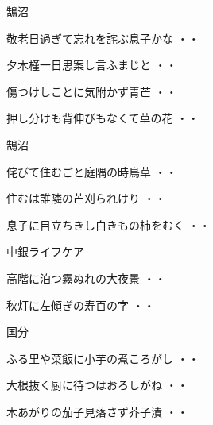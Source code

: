 \vspace{0.6cm}
鵠沼
\begin{shiika}敬老日過ぎて忘れを詫ぶ息子かな
\hfill{・・}\end{shiika}
\vspace{0.6cm}
\begin{shiika}夕木槿一日思案し言ふまじと
\hfill{・・}\end{shiika}
\vspace{0.6cm}
\begin{shiika}傷つけしことに気附かず青芒
\hfill{・・}\end{shiika}
\vspace{0.6cm}
\begin{shiika}押し分けも背伸びもなくて草の花
\hfill{・・}\end{shiika}
\vspace{0.6cm}
鵠沼
\begin{shiika}侘びて住むごと庭隅の時鳥草
\hfill{・・}\end{shiika}
\vspace{0.6cm}
\begin{shiika}住むは誰隣の芒刈られけり
\hfill{・・}\end{shiika}
\vspace{0.6cm}
\begin{shiika}息子に目立ちきし白きもの柿をむく
\hfill{・・}\end{shiika}
\vspace{0.6cm}
中銀ライフケア
\begin{shiika}高階に泊つ霧ぬれの大夜景
\hfill{・・}\end{shiika}
\vspace{0.6cm}
\begin{shiika}秋灯に左傾ぎの寿百の字
\hfill{・・}\end{shiika}
\vspace{0.6cm}
国分
\begin{shiika}ふる里や菜飯に小芋の煮ころがし
\hfill{・・}\end{shiika}
\begin{shiika}大根抜く厨に待つはおろしがね
\hfill{・・}\end{shiika}
\begin{shiika}木あがりの茄子見落さず芥子漬
\hfill{・・}\end{shiika}
